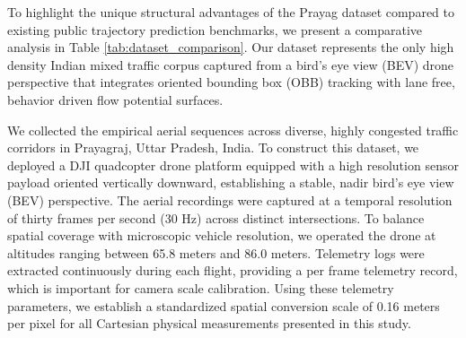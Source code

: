 \documentclass{article}
\begin{document}
To highlight the unique structural advantages of the Prayag dataset compared to existing public trajectory prediction benchmarks, we present a comparative analysis in Table \ref{tab:dataset_comparison}. Our dataset represents the only high density Indian mixed traffic corpus captured from a bird's eye view (BEV) drone perspective that integrates oriented bounding box (OBB) tracking with lane free, behavior driven flow potential surfaces.

\begin{table}[htbp]
\centering
\caption{Trajectory Dataset Comparison}
\label{tab:dataset_comparison}
\end{table}

We collected the empirical aerial sequences across diverse, highly congested traffic corridors in Prayagraj, Uttar Pradesh, India. To construct this dataset, we deployed a DJI quadcopter drone platform equipped with a high resolution sensor payload oriented vertically downward, establishing a stable, nadir bird's eye view (BEV) perspective. The aerial recordings were captured at a temporal resolution of thirty frames per second (30 Hz) across distinct intersections. To balance spatial coverage with microscopic vehicle resolution, we operated the drone at altitudes ranging between 65.8 meters and 86.0 meters. Telemetry logs were extracted continuously during each flight, providing a per frame telemetry record, which is important for camera scale calibration. Using these telemetry parameters, we establish a standardized spatial conversion scale of 0.16 meters per pixel for all Cartesian physical measurements presented in this study.
\end{document}
